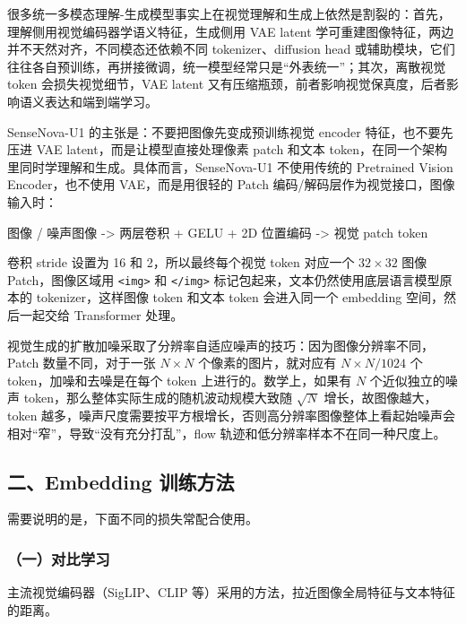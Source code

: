 很多统一多模态理解-生成模型事实上在视觉理解和生成上依然是割裂的：首先，理解侧用视觉编码器学语义特征，生成侧用 VAE latent 学可重建图像特征，两边并不天然对齐，不同模态还依赖不同 tokenizer、diffusion head 或辅助模块，它们往往各自预训练，再拼接微调，统一模型经常只是``外表统一''；其次，离散视觉 token 会损失视觉细节，VAE latent 又有压缩瓶颈，前者影响视觉保真度，后者影响语义表达和端到端学习。

SenseNova-U1 的主张是：不要把图像先变成预训练视觉 encoder 特征，也不要先压进 VAE latent，而是让模型直接处理像素 patch 和文本 token，在同一个架构里同时学理解和生成。具体而言，SenseNova-U1 不使用传统的 Pretrained Vision Encoder，也不使用 VAE，而是用很轻的 Patch 编码/解码层作为视觉接口，图像输入时：

图像 / 噪声图像 -\textgreater{} 两层卷积 + GELU + 2D 位置编码 -\textgreater{} 视觉 patch token

卷积 stride 设置为 16 和 2，所以最终每个视觉 token 对应一个 \(32\times32\) 图像 Patch，图像区域用 \texttt{\textless{}img\textgreater{}} 和 \texttt{\textless{}/img\textgreater{}} 标记包起来，文本仍然使用底层语言模型原本的 tokenizer，这样图像 token 和文本 token 会进入同一个 embedding 空间，然后一起交给 Transformer 处理。

视觉生成的扩散加噪采取了分辨率自适应噪声的技巧：因为图像分辨率不同，Patch 数量不同，对于一张 \(N\times N\) 个像素的图片，就对应有 \(N\times N/1024\) 个 token，加噪和去噪是在每个 token 上进行的。数学上，如果有 \(N\) 个近似独立的噪声 token，那么整体实际生成的随机波动规模大致随 \(\sqrt{N}\) 增长，故图像越大，token 越多，噪声尺度需要按平方根增长，否则高分辨率图像整体上看起始噪声会相对``窄''，导致``没有充分打乱''，flow 轨迹和低分辨率样本不在同一种尺度上。

\hypertarget{ux4e8cembedding-ux8badux7ec3ux65b9ux6cd5}{%
\subsection{二、Embedding 训练方法}\label{ux4e8cembedding-ux8badux7ec3ux65b9ux6cd5}}

需要说明的是，下面不同的损失常配合使用。

\hypertarget{ux4e00ux5bf9ux6bd4ux5b66ux4e60-1}{%
\subsubsection{（一）对比学习}\label{ux4e00ux5bf9ux6bd4ux5b66ux4e60-1}}

主流视觉编码器（SigLIP、CLIP 等）采用的方法，拉近图像全局特征与文本特征的距离。

